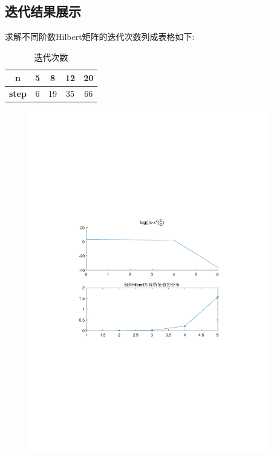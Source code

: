 \subsection{迭代结果展示}
求解不同阶数Hilbert矩阵的迭代次数列成表格如下:

\begin{table}[htbp]
  \centering
  \caption{迭代次数}
    \begin{tabular}{ccccc}
\toprule
\textbf{n} &5& 8& 12 & 20 \\
	\midrule
\textbf{step}&6   & 19  & 35  & 66 \\
\bottomrule
    \end{tabular}
\end{table}

\begin{figure}[H]
\centering
\includegraphics[width=10.5cm]{fig/5_1.pdf}
\end{figure}

